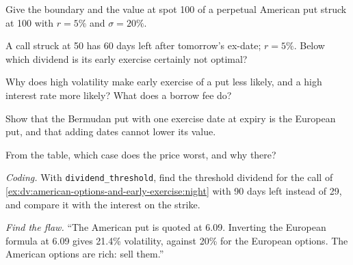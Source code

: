 \begin{exercise}[$\star$]\label{exo:dv:american-options-and-early-exercise:2}
Give the boundary and the value at spot 100 of a perpetual American put struck at 100 with
$r=5\%$ and $\sigma=20\%$.
\end{exercise}

\begin{exercise}[$\star$]\label{exo:dv:american-options-and-early-exercise:3}
A call struck at 50 has 60 days left after tomorrow's ex-date; $r=5\%$. Below which dividend
is its early exercise certainly not optimal?
\end{exercise}

\begin{exercise}[$\star\star$]\label{exo:dv:american-options-and-early-exercise:4}
Why does high volatility make early exercise of a put less likely, and a high interest
rate more likely? What does a borrow fee do?
\end{exercise}

\begin{exercise}[$\star\star$]\label{exo:dv:american-options-and-early-exercise:5}
Show that the Bermudan put with one exercise date at expiry is the European put, and that
adding dates cannot lower its value.
\end{exercise}

\begin{exercise}[$\star\star$]\label{exo:dv:american-options-and-early-exercise:6}
From the table, which case does the  price worst, and why there?
\end{exercise}

\begin{exercise}[$\star\star\star$]\label{exo:dv:american-options-and-early-exercise:7}
\emph{Coding.} With \texttt{dividend\_threshold}, find the threshold dividend for the call of
\cref{ex:dv:american-options-and-early-exercise:night} with 90 days left instead of 29, and
compare it with the interest on the strike.
\end{exercise}

\begin{exercise}[$\star\star\star$]\label{exo:dv:american-options-and-early-exercise:8}
\emph{Find the flaw.} ``The American put is quoted at 6.09. Inverting the European formula
at 6.09 gives 21.4\% volatility, against 20\% for the European options. The American
options are rich: sell them.''
\end{exercise}


